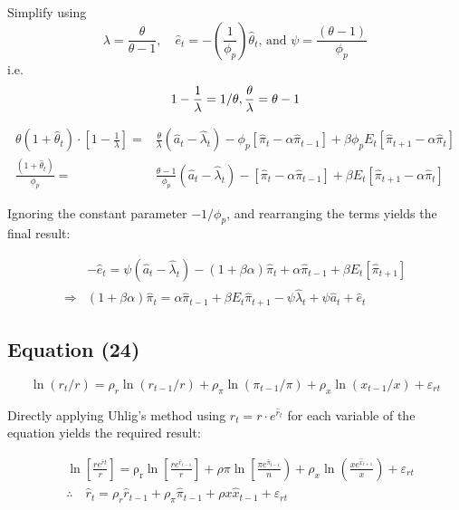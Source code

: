 \documentclass[11pt,preprint, authoryear]{elsarticle}
\numberwithin{equation}{section}
\numberwithin{figure}{section}
\numberwithin{table}{section}
\begin{document}
Simplify using
\[\lambda=\frac{\theta}{\theta-1}, \quad \hat{e}_{t}=-\left(\frac{1}{\phi_{p}}\right) \hat{\theta}_{t} \text {, and } \psi=\frac{(\theta-1)}{\phi_{p}}\]
i.e.
\[ 1 - \frac{1}{\lambda} = 1/\theta, \\ \frac{\theta}{\lambda} = \theta - 1 \]

\[\begin{aligned} \theta \left(1+\hat{\theta}_{t}\right)\cdot \left[ 1 - \frac{1}{\lambda} \right] =& \frac{\theta}{\lambda} \left(\hat{a}_{t}-\hat{\lambda}_{t}\right) - \phi_p\left[\hat{\pi}_{t}-\alpha \hat{\pi}_{t-1}\right] + \beta \phi_{p} E_{t}\left[ \hat{\pi}_{t+1}-\alpha \hat{\pi}_{t}\right]\\
 \frac{\left(1+\hat{\theta}_{t}\right)}{\phi_{p}} =& \frac{\theta - 1}{\phi_{p}} \left(\hat{a}_{t}-\hat{\lambda}_{t}\right) - \left[\hat{\pi}_{t}-\alpha \hat{\pi}_{t-1}\right] + \beta E_{t}\left[ \hat{\pi}_{t+1}-\alpha \hat{\pi}_{t}\right]
\end{aligned}\]

Ignoring the constant parameter \(-1/\phi_p\), and rearranging the terms
yields the final result:

\[\begin{aligned} &-\hat{e}_t =  \psi \left(\hat{a}_{t}-\hat{\lambda}_{t}\right) -(1+\beta \alpha)\hat{\pi}_{t} +\alpha \hat{\pi}_{t-1} + \beta E_{t}\left[ \hat{\pi}_{t+1}\right]\\
\Rightarrow &(1+\beta \alpha) \hat{\pi}_{t}=\alpha \hat{\pi}_{t-1}+\beta E_{t} \hat{\pi}_{t+1}-\psi \hat{\lambda}_{t}+\psi \hat{a}_{t}+\hat{e}_{t}
\end{aligned}\]

\hypertarget{equation-24}{%
\subsection{Equation (24)}\label{equation-24}}

\[\ln \left(r_{t} / r\right)=\rho_{r} \ln \left(r_{t-1} / r\right)+\rho_{\pi} \ln \left(\pi_{t-1} / \pi\right)+\rho_{x} \ln \left(x_{t-1} / x\right)+\varepsilon_{r t}\]

Directly applying Uhlig's method using \(r_t=r\cdot e^{\hat{r}_t}\) for
each variable of the equation yields the required result:

\[\begin{aligned} & \ln \left[\frac{r e^{\hat{r} t}}{r}\right]=\operatorname{\rho_r} \ln \left[\frac{r e^{\hat{r}_{t-1}}}{r}\right]+\rho{\pi} \ln \left[\frac{\pi e^{\hat{\pi}_{t-1}}}{n}\right)+\rho_x \ln \left(\frac{x e^{\hat{x}_{t+1}}}{x}\right)+\varepsilon_{rt} \\
& \therefore \quad \hat{r}_{t}=\rho_{r} \hat{r}_{t-1}+\rho_{\pi} \hat{\pi}_{t-1}+\rho x \hat{x}_{t-1}+\varepsilon_{r t} \end{aligned}\]
\end{document}
